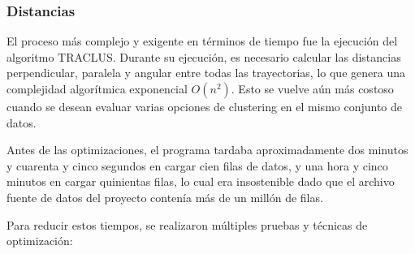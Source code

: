 \subsubsection{Distancias}

El proceso más complejo y exigente en términos de tiempo fue la ejecución del algoritmo TRACLUS. Durante su ejecución, es necesario calcular las distancias perpendicular, paralela y angular entre todas las trayectorias, lo que genera una complejidad algorítmica exponencial \(O(n^2)\). Esto se vuelve aún más costoso cuando se desean evaluar varias opciones de clustering en el mismo conjunto de datos.

Antes de las optimizaciones, el programa tardaba aproximadamente dos minutos y cuarenta y cinco segundos en cargar cien filas de datos, y una hora y cinco minutos en cargar quinientas filas, lo cual era insostenible dado que el archivo fuente de datos del proyecto contenía más de un millón de filas.

Para reducir estos tiempos, se realizaron múltiples pruebas y técnicas de optimización:

